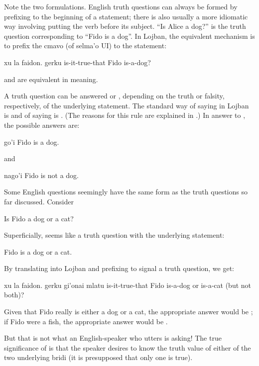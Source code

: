 Note the two formulations. English truth questions can always
    be formed by prefixing  to the beginning of
    a statement; there is also usually a more idiomatic way
    involving putting the verb before its subject. ``Is Alice a
    dog?'' is the truth question corresponding to ``Fido is a
    dog''. In Lojban, the equivalent mechanism is to prefix the
    cmavo  (of selma'o UI) to the statement:
\begin{example}
xu la faidon. gerku\n
is-it-true-that Fido is-a-dog?
\end{example}

 and  are equivalent in meaning. 

A truth question can be answered  or ,
    depending on the truth or falsity, respectively, of the
    underlying statement. The standard way of saying  in
    Lojban is  and of saying  is . (The
    reasons for this rule are explained in .) In answer to , the possible answers are:
\begin{example}
go'i\n
Fido is a dog.
\end{example}

{\noindent}and
\begin{example}
nago'i\n
Fido is not a dog.
\end{example}

Some English questions seemingly have the same form as the
    truth questions so far discussed. Consider
\begin{example}
Is Fido a dog or a cat?
\end{example}

Superficially,  seems like
    a truth question with the underlying statement:
\begin{example}
Fido is a dog or a cat.
\end{example}

By translating  into Lojban
    and prefixing  to signal a truth question, we get:
\begin{example}
xu la faidon. gerku gi'onai mlatu\n
is-it-true-that Fido is-a-dog or is-a-cat\n
\T	(but not both)?
\end{example}

Given that Fido really is either a dog or a cat, the
    appropriate answer would be ; if Fido were a fish, the
    appropriate answer would be .

But that is not what an English-speaker who utters  is asking! The true significance
    of  is that the speaker
    desires to know the truth value of either of the two underlying
    bridi (it is presupposed that only one is true).

